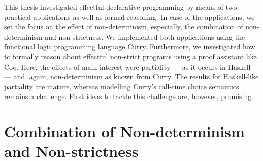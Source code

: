 %

This thesis investigated effectful declarative programming by means of two practical applications as well as formal reasoning.
In case of the applications, we set the focus on the effect of non\--determinism, especially, the combination of non\--determinism and non\--strictness.
We implemented both applications using the functional logic programming language Curry.
Furthermore, we investigated how to formally reason about effectful non\--strict programs using a proof assistant like Coq.
Here, the effects of main interest were partiality --- as it occurs in Haskell --- and, again, non\--determinism as known from Curry.
The results for Haskell\--like partiality are mature, whereas modelling Curry's call\--time choice semantics remains a challenge.
First ideas to tackle this challenge are, however, promising.

\section{Combination of Non\--determinism and Non\--strictness}

